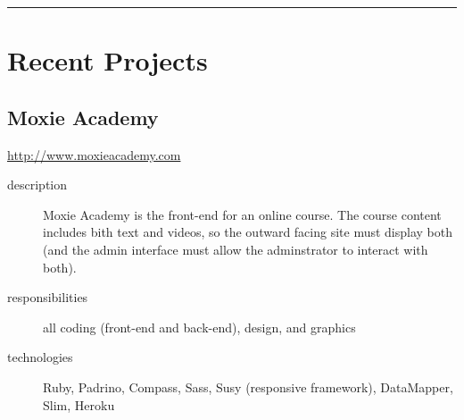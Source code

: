 \documentclass{article}
\begin{document}
\hrule
\section{Recent Projects} %
\label{sec:Recent Projects}

\subsection{Moxie Academy} %
\label{sub:Moxie Academy}

\begin{multicols}{2}
\href{http://www.moxieacademy.com}{http://www.moxieacademy.com}

\begin{description}
  \item[description] Moxie Academy is the front-end for an online 
    course.  The course content includes bith text and videos, so the 
    outward facing site must display both (and the admin interface 
    must allow the adminstrator to interact with both).
  \item[responsibilities] all coding (front-end and back-end), design, and graphics
  \item[technologies] Ruby, Padrino, Compass, Sass, Susy (responsive framework), DataMapper, Slim, Heroku
\end{description}

\vfill
\columnbreak
{}
\end{multicols}
\end{document}
